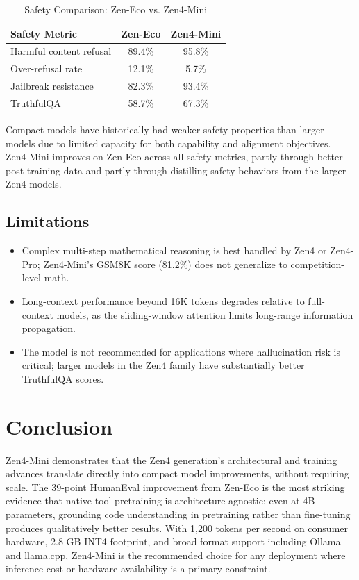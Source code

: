 \documentclass[11pt,a4paper]{article}
\begin{document}
\begin{table}[H]
\centering
\begin{tabular}{lcc}
\toprule
\textbf{Safety Metric} & \textbf{Zen-Eco} & \textbf{Zen4-Mini} \\
\midrule
Harmful content refusal       & 89.4\% & 95.8\% \\
Over-refusal rate             & 12.1\% & 5.7\%  \\
Jailbreak resistance          & 82.3\% & 93.4\% \\
TruthfulQA                    & 58.7\% & 67.3\% \\
\bottomrule
\end{tabular}
\caption{Safety Comparison: Zen-Eco vs. Zen4-Mini}
\end{table}

Compact models have historically had weaker safety properties than larger models due to
limited capacity for both capability and alignment objectives. Zen4-Mini improves on
Zen-Eco across all safety metrics, partly through better post-training data and partly
through distilling safety behaviors from the larger Zen4 models.

\subsection{Limitations}

\begin{itemize}
    \item Complex multi-step mathematical reasoning is best handled by Zen4 or Zen4-Pro;
    Zen4-Mini's GSM8K score (81.2\%) does not generalize to competition-level math.
    \item Long-context performance beyond 16K tokens degrades relative to full-context
    models, as the sliding-window attention limits long-range information propagation.
    \item The model is not recommended for applications where hallucination risk is
    critical; larger models in the Zen4 family have substantially better TruthfulQA scores.
\end{itemize}

\section{Conclusion}

Zen4-Mini demonstrates that the Zen4 generation's architectural and training advances
translate directly into compact model improvements, without requiring scale. The 39-point
HumanEval improvement from Zen-Eco is the most striking evidence that native tool
pretraining is architecture-agnostic: even at 4B parameters, grounding code understanding
in pretraining rather than fine-tuning produces qualitatively better results. With 1,200
tokens per second on consumer hardware, 2.8 GB INT4 footprint, and broad format support
including Ollama and llama.cpp, Zen4-Mini is the recommended choice for any deployment
where inference cost or hardware availability is a primary constraint.
\end{document}
